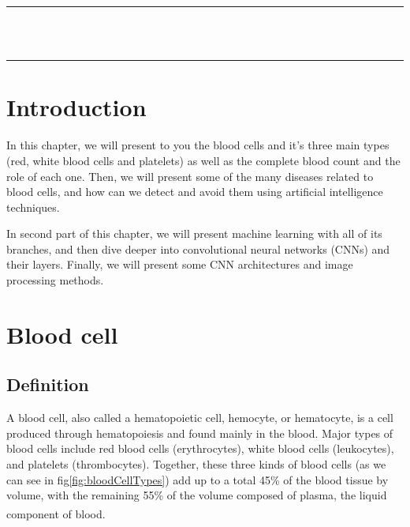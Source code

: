 \thispagestyle{empty}
\vspace*{\fill}
\begin{center}
    {\color{Black} \rule{\linewidth}{1.2mm} }\\
\vspace{0.25in}
{\centering{}}
\vspace{0.35in}\\
    {\color{Black} \rule{\linewidth}{1.2mm} }
\end{center}
\vspace*{\fill}
\setcounter{section}{0}

\newpage

\section{Introduction}
\vspace{0.2in}
\hspace{\parindent}
In this chapter, we will present to you the blood cells and it's three main types (red, white blood cells and platelets) as well as the complete blood count and the role of each one. Then, we will present some of the many diseases related to blood cells, and how can we detect and avoid them using artificial intelligence techniques.

In second part of this chapter, we will present machine learning with all of its branches, and then dive deeper into convolutional neural networks (CNNs) and their layers. Finally, we will present some CNN architectures and image processing methods.
\section{Blood cell}
\subsection{Definition}
\hspace{\parindent}
A blood cell, also called a hematopoietic cell, hemocyte, or hematocyte, is a cell produced through hematopoiesis and found mainly in the blood. Major types of blood cells include red blood cells (erythrocytes), white blood cells (leukocytes), and platelets (thrombocytes). Together, these three kinds of blood cells (as we can see in fig\ref{fig:bloodCellTypes}) add up to a total 45\% of the blood tissue by volume, with the remaining 55\% of the volume composed of plasma, the liquid component of blood. \textsuperscript{\cite{hopkins1993human}}\\

